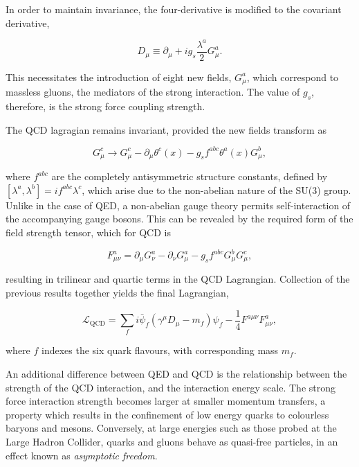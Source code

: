 In order to maintain invariance, the four-derivative is modified to the covariant derivative,

\begin{equation}
    D_{\mu} \equiv \partial_{\mu} + ig_{s}\frac{\lambda^{a}}{2}G^{a}_{\mu}.
\end{equation}

\noindent This necessitates the introduction of eight new fields, ${G_{\mu}^{a}}$, which correspond to massless gluons, the mediators of the strong interaction. The value of ${g_{s}}$, therefore, is the strong force coupling strength. 

The QCD lagragian remains invariant, provided the new fields transform as

\begin{equation}
    G_{\mu}^{c} \rightarrow G_{\mu}^{c} - \partial_{\mu}\theta^{c}(x) - g_{s}f^{abc}\theta^{a}(x)G_{\mu}^{b},
\end{equation}

\noindent where ${f^{abc}}$ are the completely antisymmetric structure constants, defined by $\left[ \lambda^{a},\lambda^{b} \right] = if^{abc}\lambda^{c}$, which arise due to the non-abelian nature of the SU(3) group. Unlike in the case of QED, a non-abelian gauge theory permits self-interaction of the accompanying gauge bosons. This can be revealed by the required form of the field strength tensor, which for QCD is

\begin{equation}
      F^{a}_{\mu\nu} = \partial_{\mu}G_{\nu}^{a} - \partial_{\nu}G_{\mu}^{a} - g_{s}f^{abc}G^{b}_{\mu}G^{c}_{\mu}, 
\end{equation}

\noindent resulting in trilinear and quartic terms in the QCD Lagrangian. Collection of the previous results together yields the final Lagrangian,

\begin{equation}
    \mathcal{L_{\mathrm{QCD}}} = \sum_{f} i\bar{\psi}_{f}(\gamma^{\mu}D_{\mu} - m_{f})\psi_{f} - \frac{1}{4}F^{a\mu\nu}F_{\mu\nu}^{a},
\end{equation}

\noindent where ${f}$ indexes the six quark flavours, with corresponding mass ${m_{f}}$. %

An additional difference between QED and QCD is the relationship between the strength of the QCD interaction, and the interaction energy scale. The strong force interaction strength becomes larger at smaller momentum transfers, a property which results in the confinement of low energy quarks to colourless baryons and mesons. Conversely, at large energies such as those probed at the Large Hadron Collider, quarks and gluons behave as quasi-free particles, in an effect known as \textit{asymptotic freedom}.




